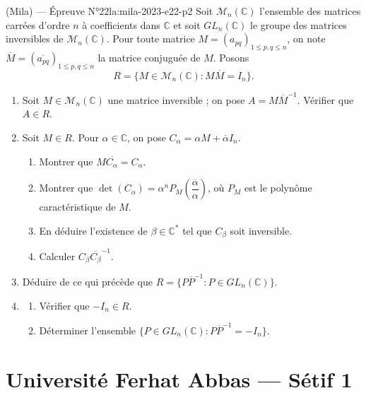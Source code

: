 \begin{problem}{(Mila) — Épreuve N°22}{la:mila-2023-e22-p2}
Soit $\mathscr{M}_n(\mathbb{C})$ l'ensemble des matrices carrées d'ordre $n$ à
coefficients dans $\mathbb{C}$ et soit $GL_n(\mathbb{C})$ le groupe des matrices
inversibles de $\mathscr{M}_n(\mathbb{C})$. Pour toute matrice
$M=(a_{pq})_{1\leq p,q\leq n}$, on note $\overline M=(\overline{a_{pq}})_{1\leq p,q\leq n}$
la matrice conjuguée de $M$. Posons
$$
R=\{M\in \mathscr{M}_n(\mathbb{C}) : M\overline M=I_n\}.
$$
\begin{enumerate}
\item Soit $M\in \mathscr{M}_n(\mathbb{C})$ une matrice inversible ; on pose
      $A=M\overline M^{-1}$. Vérifier que $A\in R$.
\item Soit $M\in R$. Pour $\alpha\in\mathbb{C}$, on pose
      $C_\alpha=\alpha M+\overline\alpha I_n$.
      \begin{enumerate}
      \item Montrer que $M\overline{C_\alpha}=C_\alpha$.
      \item Montrer que $\det(C_\alpha)=\alpha^nP_M\!\left(\dfrac{\overline\alpha}{\alpha}\right)$,
            où $P_M$ est le polynôme caractéristique de $M$.
      \item En déduire l'existence de $\beta\in\mathbb{C}^*$ tel que $C_\beta$ soit
            inversible.
      \item Calculer $C_\beta\overline{C_\beta}^{-1}$.
      \end{enumerate}
\item Déduire de ce qui précède que
      $R=\{P\overline P^{-1} : P\in GL_n(\mathbb{C})\}$.
\item \begin{enumerate}
      \item Vérifier que $-I_n\in R$.
      \item Déterminer l'ensemble $\{P\in GL_n(\mathbb{C}) : P\overline P^{-1}=-I_n\}$.
      \end{enumerate}
\end{enumerate}

\end{problem}

\newpage

\section{Université Ferhat Abbas --- Sétif 1}

